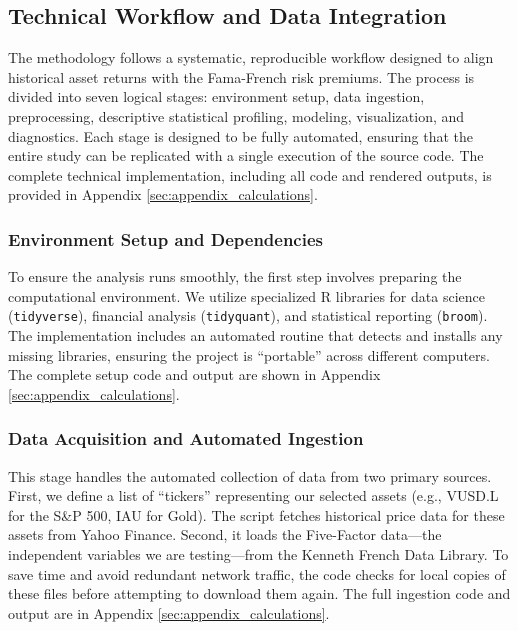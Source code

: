\documentclass[12pt]{article}
\begin{document}
\subsection{Technical Workflow and Data Integration}
The methodology follows a systematic, reproducible workflow designed to align historical asset returns with the Fama-French risk premiums. The process is divided into seven logical stages: environment setup, data ingestion, preprocessing, descriptive statistical profiling, modeling, visualization, and diagnostics. Each stage is designed to be fully automated, ensuring that the entire study can be replicated with a single execution of the source code. The complete technical implementation, including all code and rendered outputs, is provided in Appendix \ref{sec:appendix_calculations}.

\subsubsection{Environment Setup and Dependencies}
To ensure the analysis runs smoothly, the first step involves preparing the computational environment. We utilize specialized R libraries for data science (\texttt{tidyverse}), financial analysis (\texttt{tidyquant}), and statistical reporting (\texttt{broom}). The implementation includes an automated routine that detects and installs any missing libraries, ensuring the project is ``portable'' across different computers. The complete setup code and output are shown in Appendix \ref{sec:appendix_calculations}.

\subsubsection{Data Acquisition and Automated Ingestion}
This stage handles the automated collection of data from two primary sources. First, we define a list of ``tickers'' representing our selected assets (e.g., VUSD.L for the S\&P 500, IAU for Gold). The script fetches historical price data for these assets from Yahoo Finance. Second, it loads the Five-Factor data---the independent variables we are testing---from the Kenneth French Data Library. To save time and avoid redundant network traffic, the code checks for local copies of these files before attempting to download them again. The full ingestion code and output are in Appendix \ref{sec:appendix_calculations}.
\end{document}
